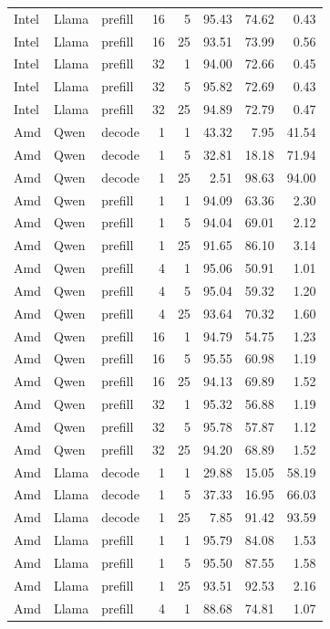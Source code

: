 \begin{tabular}{lllrrrrr}
Intel & Llama & prefill & 16 & 5 & 95.43 & 74.62 & 0.43 \\
Intel & Llama & prefill & 16 & 25 & 93.51 & 73.99 & 0.56 \\
Intel & Llama & prefill & 32 & 1 & 94.00 & 72.66 & 0.45 \\
Intel & Llama & prefill & 32 & 5 & 95.82 & 72.69 & 0.43 \\
Intel & Llama & prefill & 32 & 25 & 94.89 & 72.79 & 0.47 \\
Amd & Qwen & decode & 1 & 1 & 43.32 & 7.95 & 41.54 \\
Amd & Qwen & decode & 1 & 5 & 32.81 & 18.18 & 71.94 \\
Amd & Qwen & decode & 1 & 25 & 2.51 & 98.63 & 94.00 \\
Amd & Qwen & prefill & 1 & 1 & 94.09 & 63.36 & 2.30 \\
Amd & Qwen & prefill & 1 & 5 & 94.04 & 69.01 & 2.12 \\
Amd & Qwen & prefill & 1 & 25 & 91.65 & 86.10 & 3.14 \\
Amd & Qwen & prefill & 4 & 1 & 95.06 & 50.91 & 1.01 \\
Amd & Qwen & prefill & 4 & 5 & 95.04 & 59.32 & 1.20 \\
Amd & Qwen & prefill & 4 & 25 & 93.64 & 70.32 & 1.60 \\
Amd & Qwen & prefill & 16 & 1 & 94.79 & 54.75 & 1.23 \\
Amd & Qwen & prefill & 16 & 5 & 95.55 & 60.98 & 1.19 \\
Amd & Qwen & prefill & 16 & 25 & 94.13 & 69.89 & 1.52 \\
Amd & Qwen & prefill & 32 & 1 & 95.32 & 56.88 & 1.19 \\
Amd & Qwen & prefill & 32 & 5 & 95.78 & 57.87 & 1.12 \\
Amd & Qwen & prefill & 32 & 25 & 94.20 & 68.89 & 1.52 \\
Amd & Llama & decode & 1 & 1 & 29.88 & 15.05 & 58.19 \\
Amd & Llama & decode & 1 & 5 & 37.33 & 16.95 & 66.03 \\
Amd & Llama & decode & 1 & 25 & 7.85 & 91.42 & 93.59 \\
Amd & Llama & prefill & 1 & 1 & 95.79 & 84.08 & 1.53 \\
Amd & Llama & prefill & 1 & 5 & 95.50 & 87.55 & 1.58 \\
Amd & Llama & prefill & 1 & 25 & 93.51 & 92.53 & 2.16 \\
Amd & Llama & prefill & 4 & 1 & 88.68 & 74.81 & 1.07 \\

\end{tabular}
